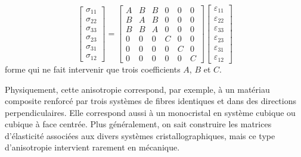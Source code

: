 \begin{equation}
    \begin{bmatrix}
        \sigma_{11}\\
        \sigma_{22}\\
        \sigma_{33}\\
        \sigma_{23}\\
        \sigma_{31}\\
        \sigma_{12}
    \end{bmatrix}
    =
    \begin{bmatrix}
        A & B & B & 0 & 0 & 0 \\
        B & A & B & 0 & 0 & 0 \\
        B & B & A & 0 & 0 & 0 \\
        0 & 0 & 0 & C & 0 & 0 \\
        0 & 0 & 0 & 0 & C & 0 \\
        0 & 0 & 0 & 0 & 0 & C
    \end{bmatrix}
    \begin{bmatrix}
        \varepsilon_{11}\\
        \varepsilon_{22}\\
        \varepsilon_{33}\\
        \varepsilon_{23}\\
        \varepsilon_{31}\\
        \varepsilon_{12}
    \end{bmatrix}
    \label{eq:Ch05-018}
\end{equation}
forme qui ne fait intervenir que trois coefficients $A$, $B$ et $C$. 

Physiquement, cette anisotropie correspond, par exemple, à un matériau composite renforcé par trois systèmes de fibres identiques et dans des directions perpendiculaires.
Elle correspond aussi à un monocristal en système cubique ou cubique à face centrée.
Plus généralement, on sait construire les matrices d'élasticité associées aux divers systèmes cristallographiques, mais ce type d'anisotropie intervient rarement en mécanique. 

